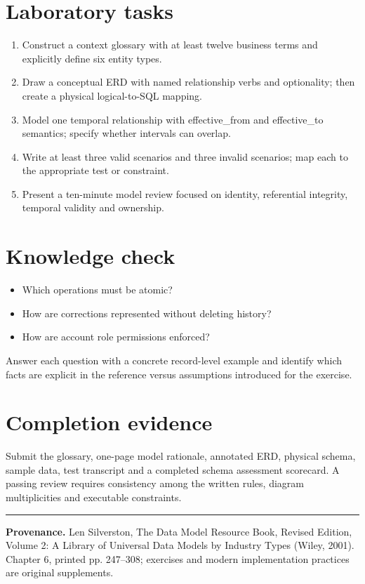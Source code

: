 \documentclass[11pt,letterpaper]{article}
\begin{document}
\section{Laboratory tasks}
\begin{enumerate}
\item Construct a context glossary with at least twelve business terms and explicitly define six entity types.
\item Draw a conceptual ERD with named relationship verbs and optionality; then create a physical logical-to-SQL mapping.
\item Model one temporal relationship with effective\_from and effective\_to semantics; specify whether intervals can overlap.
\item Write at least three valid scenarios and three invalid scenarios; map each to the appropriate test or constraint.
\item Present a ten-minute model review focused on identity, referential integrity, temporal validity and ownership.
\end{enumerate}

\section{Knowledge check}
\begin{itemize}
\item Which operations must be atomic?
\item How are corrections represented without deleting history?
\item How are account role permissions enforced?
\end{itemize}
Answer each question with a concrete record-level example and identify which facts are explicit in the reference versus assumptions introduced for the exercise.


\section{Completion evidence}
Submit the glossary, one-page model rationale, annotated ERD, physical schema, sample data, test transcript and a completed schema assessment scorecard. A passing review requires consistency among the written rules, diagram multiplicities and executable constraints.


\vfill
\hrule
{\footnotesize\textbf{Provenance.} Len Silverston, The Data Model Resource Book, Revised Edition, Volume 2: A Library of Universal Data Models by Industry Types (Wiley, 2001). Chapter 6, printed pp. 247--308; exercises and modern implementation practices are original supplements.}
\end{document}
